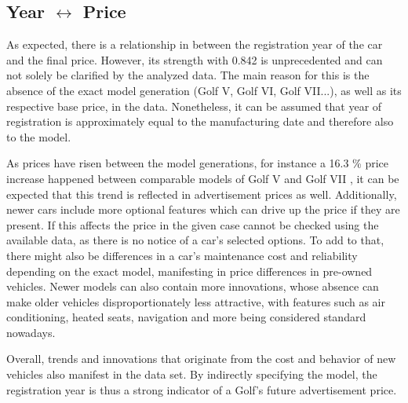 \subsection{Year $\leftrightarrow$ Price} \label{year_to_price_correlation}
As expected, there is a relationship in between the registration year of the car and the final price.
However, its strength with 0.842 is unprecedented and can not solely be clarified by the analyzed data.
The main reason for this is the absence of the exact model generation (Golf V, Golf VI, Golf VII...), as well as its respective base price, in the data.
Nonetheless, it can be assumed that year of registration is approximately equal to the manufacturing date and therefore also to the model.
\par
As prices have risen between the model generations, for instance a 16.3 \% price increase happened between comparable models of Golf V and Golf VII \autocite{DuelVWGolf},
it can be expected that this trend is reflected in advertisement prices as well.
Additionally, newer cars include more optional features which can drive up the price if they are present.
If this affects the price in the given case cannot be checked using the available data,
as there is no notice of a car's selected options.
\newline
To add to that, there might also be differences in a car's maintenance cost and reliability depending on the exact model, manifesting in price differences in pre-owned vehicles.
Newer models can also contain more innovations, whose absence can make older vehicles  disproportionately less attractive, with features such as air conditioning, heated seats,
navigation and more being considered standard nowadays.
\par
Overall, trends and innovations that originate from the cost and behavior of new vehicles also manifest in the data set.
By indirectly specifying the model, the registration year is thus a strong indicator of a Golf's future advertisement price.
